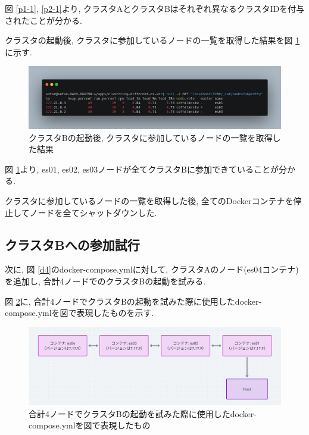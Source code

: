 図 \ref{p1-1}, \ref{p2-1}より, クラスタAとクラスタBはそれぞれ異なるクラスタIDを付与されたことが分かる.

クラスタの起動後, クラスタに参加しているノードの一覧を取得した結果を図 \ref{p2-2}に示す.

\begin{figure}[!ht]
  \begin{center}
    \includegraphics[width=160mm]{sotu/figure/3nodes-list.png}
    \caption{クラスタBの起動後, クラスタに参加しているノードの一覧を取得した結果}
    \label{p2-2}
  \end{center}
\end{figure}

図 \ref{p2-2}より, es01, es02, es03ノードが全てクラスタBに参加できていることが分かる.

クラスタに参加しているノードの一覧を取得した後, 全てのDockerコンテナを停止してノードを全てシャットダウンした.

\subsection{クラスタBへの参加試行}

次に, 図 \ref{d4}のdocker-compose.ymlに対して, クラスタAのノード(es04コンテナ)を追加し, 合計4ノードでのクラスタBの起動を試みる.

図 \ref{d5}に, 合計4ノードでクラスタBの起動を試みた際に使用したdocker-compose.ymlを図で表現したものを示す.

\begin{figure}[!ht]
  \begin{center}
    \includegraphics[width=160mm]{sotu/figure/4-7.17.9.png}
    \caption{合計4ノードでクラスタBの起動を試みた際に使用したdocker-compose.ymlを図で表現したもの}
    \label{d5}
  \end{center}
\end{figure}

